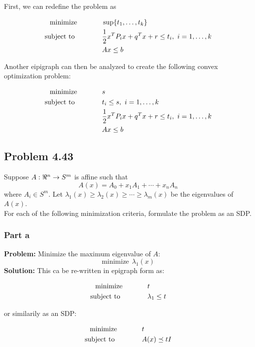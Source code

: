 \documentclass[letter]{article}
\newcommand{\optpblm}[3][eq:default]{
	\begin{equation}\label{#1}
		\begin{aligned}
			\text{minimize} \hspace{0.5in} &#2\vspace{5pt}\\
			\text{subject to \hspace{0.5in}} &#3
		\end{aligned}	
	\end{equation}
}
\begin{document}
First, we can redefine the problem as
\optpblm{\sup \{t_1, \dots, t_k\}}{
	\frac{1}{2} x^T P_i x + q^T x + r \leq t_i, \ i = 1, \dots, k\\
	&Ax \leq b}
Another eipigraph can then be analyzed to create the following convex optimization problem:
\optpblm{s}{
	t_i \leq s, \ i = 1, \dots, k\\
	&\frac{1}{2} x^T P_i x + q^T x + r \leq t_i, \ i = 1, \dots, k\\
	&Ax \leq b}




\newpage
\subsection{Problem 4.43}
Suppose $A: \real^n \to S^m$ is affine such that
\begin{equation}
	A(x) = A_0 + x_1 A_1 + \cdots + x_n A_n
\end{equation}
where $A_i \in S^m$. Let $\lambda_1(x) \geq \lambda_2(x) \geq \cdots \geq \lambda_m(x)$ be the eigenvalues of $A(x)$.\\


For each of the following minimization criteria, formulate the problem as an SDP.\\

\subsubsection{Part a}
\textbf{Problem:}
Minimize the maximum eigenvalue of $A$: $$\text{minimize} \ \ \lambda_1(x)$$
\textbf{Solution:}
This ca be re-written in epigraph form as:
\optpblm{t}{\lambda_1 \leq t}
or similarily as an SDP:
\optpblm{t}{A(x) \preceq t I}


%
\end{document}
